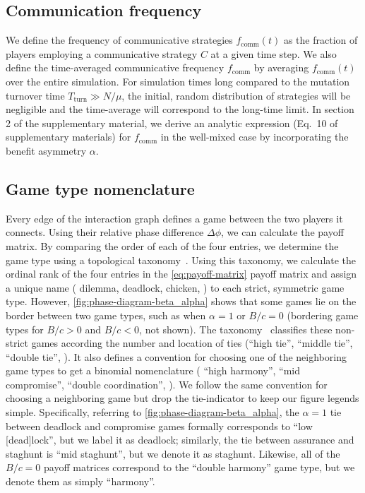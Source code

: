 \documentclass[pdflatex,lineno,referee,sn-nature]{sn-jnl}
\begin{document}
\subsection{Communication frequency}
We define the frequency of communicative strategies
$f_{\text{comm}}(t)$ as the fraction of players employing
a communicative strategy $C$ at a given time step.
We also define the time-averaged communicative frequency
$f_{\text{comm}}$
by averaging $f_{\text{comm}}(t)$ over the entire simulation.
For simulation times long compared to the mutation turnover time
$T_{\text{turn}} \gg N/\mu$,
the initial, random distribution of strategies will be negligible
and the time-average will correspond to the long-time limit.
In section 2 of the supplementary material,
we derive an analytic expression (Eq.\ 10 of supplementary materials) for
$f_{\text{comm}}$ in the well-mixed case
by incorporating the benefit asymmetry $\alpha$.

\subsection{Game type nomenclature}
\label{sec:game-type-nomenclature}
Every edge of the interaction graph
defines a game between the two players it connects.
Using their relative phase difference $\Delta \phi$,
we can calculate the payoff matrix.
By comparing the order of each of the four entries,
we determine the game type using
a topological taxonomy~\citep{bruns2015names}.
Using this taxonomy, we calculate the ordinal rank of the four entries
in the \cref{eq:payoff-matrix} payoff matrix
and assign a unique name (\eg{} dilemma, deadlock, chicken, \etc{})
to each strict, symmetric game type.
However, \cref{fig:phase-diagram-beta_alpha}
shows that some games lie on the border between two game types,
such as when $\alpha = 1$ or $B/c = 0$
(bordering game types for $B/c > 0$ and $B/c < 0$, not shown).
The taxonomy~\citep{bruns2015names} classifies these non-strict games
according the number and location of ties (``high tie'', ``middle tie'',
``double tie'', \etc{}).
It also defines a convention for choosing one of the neighboring game types
to get a binomial nomenclature (\eg{} ``high harmony'', ``mid compromise'',
``double coordination'', \etc{}).
We follow the same convention for choosing a neighboring game
but drop the tie-indicator to keep our figure legends simple.
Specifically, referring to \cref{fig:phase-diagram-beta_alpha},
the $\alpha = 1$ tie between deadlock and compromise games
formally corresponds to ``low [dead]lock'',
but we label it as deadlock;
similarly, the tie between assurance and staghunt
is ``mid staghunt'', but we denote it as staghunt.
Likewise, all of the $B/c = 0$ payoff matrices
correspond to the ``double harmony'' game type,
but we denote them as simply ``harmony''.
\end{document}
